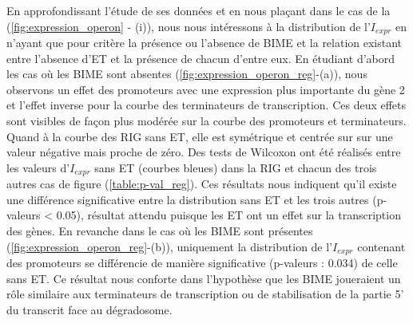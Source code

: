 \documentclass[12pt,a4paper]{report}
\begin{document}
\begin{onehalfspace}
En approfondissant l'étude de ses données et en nous plaçant dans le cas de la (\autoref{fig:expression_operon} - (i)), nous nous intéressons à la distribution de l'$I_{expr}$ en n'ayant que pour critère la présence ou l'absence de BIME et la relation existant entre l'absence d'ET et la présence de chacun d'entre eux. En étudiant d'abord les cas où les BIME sont absentes (\autoref{fig:expression_operon_reg}-(a)), nous observons un effet des promoteurs avec une expression plus importante du gène 2 et l'effet inverse pour la courbe des terminateurs de transcription. Ces deux effets sont visibles de façon plus modérée sur la courbe des promoteurs et terminateurs. Quand à la courbe des RIG sans ET, elle est symétrique et centrée sur sur une valeur négative mais proche de zéro. Des tests de Wilcoxon ont été réalisés entre les valeurs d'$I_{expr}$ sans ET (courbes bleues) dans la RIG et chacun des trois autres cas de figure (\autoref{table:p-val_reg}). Ces résultats nous indiquent qu'il existe une différence significative entre la distribution sans ET et les trois autres (p-valeurs < 0.05), résultat attendu puisque les ET ont un effet sur la transcription des gènes. En revanche dans le cas où les BIME sont présentes (\autoref{fig:expression_operon_reg}-(b)), uniquement la distribution de l'$I_{expr}$ contenant des promoteurs se différencie de manière significative (p-valeurs : 0.034) de celle sans ET. Ce résultat nous conforte dans l'hypothèse que les BIME joueraient un r\^ole similaire aux terminateurs de transcription ou de stabilisation de la partie 5' du transcrit face au dégradosome.


\end{onehalfspace}
\end{document}
